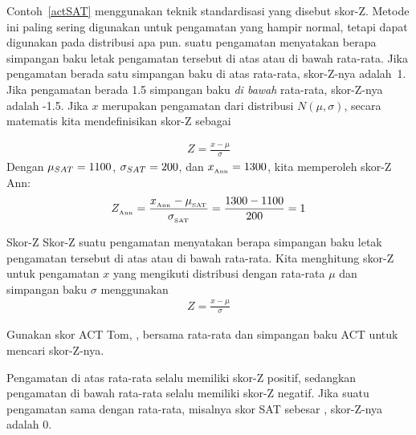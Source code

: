 \begingroup
{}
Contoh~\ref{actSAT} menggunakan teknik standardisasi yang disebut
skor-Z. Metode ini paling sering digunakan untuk pengamatan yang
hampir normal, tetapi dapat digunakan pada distribusi apa pun.
 suatu pengamatan menyatakan
berapa simpangan baku letak pengamatan tersebut
di atas atau di bawah rata-rata.
Jika pengamatan berada satu simpangan baku di atas rata-rata,
skor-Z-nya adalah~1.
Jika pengamatan berada 1.5 simpangan baku \emph{di bawah} rata-rata,
skor-Z-nya adalah -1.5.
Jika $x$ merupakan pengamatan dari distribusi $N(\mu, \sigma)$,
secara matematis kita mendefinisikan skor-Z sebagai
\par
\endgroup
\begin{align*}
Z = \frac{x - \mu}{\sigma}
\end{align*}
Dengan $\mu_{SAT} = 1100{}$, $\sigma_{SAT} = 200{}$,
dan $x_{_{\text{Ann}}} = 1300{}$, kita memperoleh skor-Z Ann:
\begin{align*}
Z_{_{\text{Ann}}}
  = \frac{x_{_{\text{Ann}}} - \mu_{_{\text{SAT}}}}
      {\sigma_{_{\text{SAT}}}}
  = \frac{1300{} - 1100{}}{200{}}
  = 1{}
\end{align*}

\begin{onebox}{Skor-Z}
  Skor-Z suatu pengamatan menyatakan berapa simpangan baku letak
  pengamatan tersebut di atas atau di bawah rata-rata.
  Kita menghitung skor-Z untuk pengamatan $x$ yang mengikuti distribusi
  dengan rata-rata $\mu$ dan simpangan baku $\sigma$ menggunakan
  \begin{align*}
  Z = \frac{x - \mu}{\sigma}
  \end{align*}
\end{onebox}

\begin{exercisewrap}
\begin{nexercise}
Gunakan skor ACT Tom, \tomsatscore{}, bersama rata-rata dan
simpangan baku ACT untuk mencari skor-Z-nya.\footnotemark{}
\end{nexercise}
\end{exercisewrap}

Pengamatan di atas rata-rata selalu memiliki skor-Z positif,
sedangkan pengamatan di bawah rata-rata selalu memiliki skor-Z negatif.
Jika suatu pengamatan sama dengan rata-rata, misalnya skor SAT
sebesar \satmean{}, skor-Z-nya adalah $0$.

